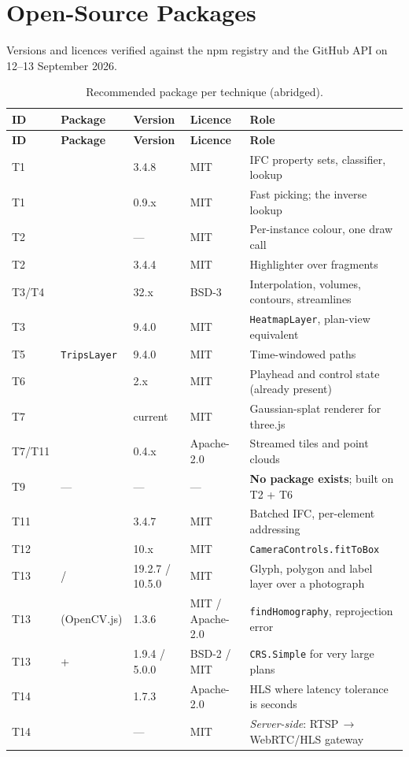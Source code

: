 \section{Open-Source Packages}
\label{sec:packages}

Versions and licences verified against the npm registry and the GitHub API on 12--13
September 2026.

\begin{longtable}{@{}L{0.8cm}L{4.6cm}L{2.0cm}L{1.8cm}L{5.0cm}@{}}
\caption{Recommended package per technique (abridged).}\label{tab:packages}\\
\toprule
\textbf{ID} & \textbf{Package} & \textbf{Version} & \textbf{Licence} & \textbf{Role} \\
\midrule
\endfirsthead
\toprule
\textbf{ID} & \textbf{Package} & \textbf{Version} & \textbf{Licence} & \textbf{Role} \\
\midrule
\endhead
T1 &  & 3.4.8 & MIT & IFC property sets, classifier, lookup \\
T1 &  & 0.9.x & MIT & Fast picking; the inverse lookup \\
T2 &  & --- & MIT & Per-instance colour, one draw call \\
T2 &  & 3.4.4 & MIT & Highlighter over fragments \\
T3/T4 &  & 32.x & BSD-3 & Interpolation, volumes, contours, streamlines \\
T3 &  & 9.4.0 & MIT & \texttt{HeatmapLayer}, plan-view equivalent \\
T5 &  \texttt{TripsLayer} & 9.4.0 & MIT & Time-windowed paths \\
T6 &  & 2.x & MIT & Playhead and control state (already present) \\
T7 &  & current & MIT & Gaussian-splat renderer for three.js \\
T7/T11 &  & 0.4.x & Apache-2.0 & Streamed tiles and point clouds \\
T9 & --- & --- & --- & \textbf{No package exists}; built on T2 + T6 \\
T11 &  & 3.4.7 & MIT & Batched IFC, per-element addressing \\
T12 &  & 10.x & MIT & \texttt{CameraControls.fitToBox} \\
T13 &  /  & 19.2.7 / 10.5.0 & MIT & Glyph, polygon and label
layer over a photograph \\
T13 &  (OpenCV.js) & 1.3.6 & MIT / Apache-2.0 & \texttt{findHomography},
reprojection error \\
T13 &  +  & 1.9.4 / 5.0.0 & BSD-2 / MIT &
\texttt{CRS.Simple} for very large plans \\
T14 &  & 1.7.3 & Apache-2.0 & HLS where latency tolerance is seconds \\
T14 &  & --- & MIT & \emph{Server-side}: RTSP\,$\rightarrow$\,WebRTC/HLS
gateway \\
\bottomrule
\end{longtable}

